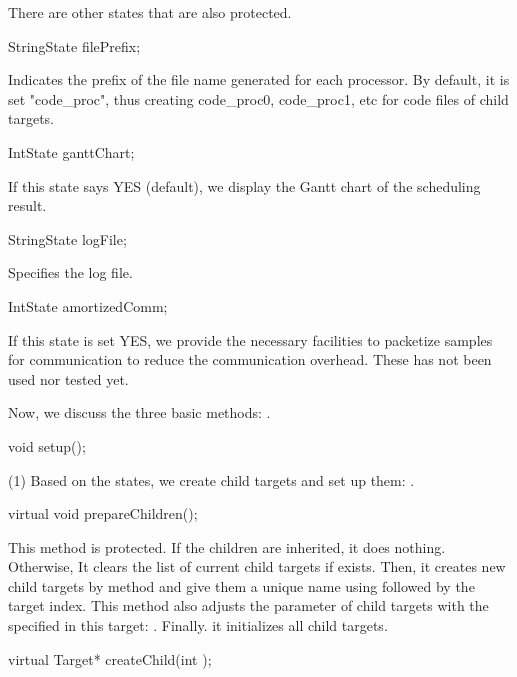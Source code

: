 There are other states that are also protected.

\begin{example}
StringState filePrefix;
\end{example}

Indicates the prefix of the file name generated for each processor.
By default, it is set "code\_proc", thus creating code\_proc0, code\_proc1, etc
for code files of child targets.

\begin{example}
IntState ganttChart;
\end{example}

If this state says YES (default), we display the Gantt chart of the 
scheduling result. 

\begin{example}
StringState logFile;
\end{example}

Specifies the log file.

\begin{example}
IntState amortizedComm;
\end{example}

If this state is set YES, we provide the necessary facilities to packetize
samples for communication to reduce the communication overhead. These
has not been used nor tested yet.

Now, we discuss the three basic methods: .

\begin{example}
void setup();
\end{example}

(1) Based on the states, we create child targets and set up them:
.

\begin{example}
virtual void prepareChildren();
\end{example}

This method is protected. If the children are inherited, it does nothing.
Otherwise, It clears the list of current child targets if exists. Then,
it creates new child targets by  method and give them
a unique name using  followed by the target index.
This method also adjusts the  parameter of child targets
with the  specified in this target: .
Finally. it initializes all child targets.

\begin{example}
virtual Target* createChild(int );
\end{example}

